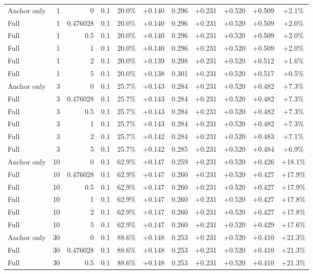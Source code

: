 \begin{table}[htbp]
\begin{tabular}{lrrrccccccc}
Anchor only & 1 & 0 & 0.1 & 20.0\% & +0.140 & 0.296 & +0.231 & +0.520 & +0.509 & +2.1\% \\
Full & 1 & 0.476028 & 0.1 & 20.0\% & +0.140 & 0.296 & +0.231 & +0.520 & +0.509 & +2.0\% \\
Full & 1 & 0.5 & 0.1 & 20.0\% & +0.140 & 0.296 & +0.231 & +0.520 & +0.509 & +2.0\% \\
Full & 1 & 1 & 0.1 & 20.0\% & +0.140 & 0.296 & +0.231 & +0.520 & +0.509 & +2.0\% \\
Full & 1 & 2 & 0.1 & 20.0\% & +0.139 & 0.298 & +0.231 & +0.520 & +0.512 & +1.6\% \\
Full & 1 & 5 & 0.1 & 20.0\% & +0.138 & 0.301 & +0.231 & +0.520 & +0.517 & +0.5\% \\
Anchor only & 3 & 0 & 0.1 & 25.7\% & +0.143 & 0.284 & +0.231 & +0.520 & +0.482 & +7.3\% \\
Full & 3 & 0.476028 & 0.1 & 25.7\% & +0.143 & 0.284 & +0.231 & +0.520 & +0.482 & +7.3\% \\
Full & 3 & 0.5 & 0.1 & 25.7\% & +0.143 & 0.284 & +0.231 & +0.520 & +0.482 & +7.3\% \\
Full & 3 & 1 & 0.1 & 25.7\% & +0.143 & 0.284 & +0.231 & +0.520 & +0.482 & +7.3\% \\
Full & 3 & 2 & 0.1 & 25.7\% & +0.142 & 0.284 & +0.231 & +0.520 & +0.483 & +7.1\% \\
Full & 3 & 5 & 0.1 & 25.7\% & +0.142 & 0.285 & +0.231 & +0.520 & +0.484 & +6.9\% \\
Anchor only & 10 & 0 & 0.1 & 62.9\% & +0.147 & 0.259 & +0.231 & +0.520 & +0.426 & +18.1\% \\
Full & 10 & 0.476028 & 0.1 & 62.9\% & +0.147 & 0.260 & +0.231 & +0.520 & +0.427 & +17.9\% \\
Full & 10 & 0.5 & 0.1 & 62.9\% & +0.147 & 0.260 & +0.231 & +0.520 & +0.427 & +17.9\% \\
Full & 10 & 1 & 0.1 & 62.9\% & +0.147 & 0.260 & +0.231 & +0.520 & +0.427 & +17.8\% \\
Full & 10 & 2 & 0.1 & 62.9\% & +0.147 & 0.260 & +0.231 & +0.520 & +0.427 & +17.8\% \\
Full & 10 & 5 & 0.1 & 62.9\% & +0.147 & 0.260 & +0.231 & +0.520 & +0.429 & +17.6\% \\
Anchor only & 30 & 0 & 0.1 & 88.6\% & +0.148 & 0.253 & +0.231 & +0.520 & +0.410 & +21.3\% \\
Full & 30 & 0.476028 & 0.1 & 88.6\% & +0.148 & 0.253 & +0.231 & +0.520 & +0.410 & +21.3\% \\
Full & 30 & 0.5 & 0.1 & 88.6\% & +0.148 & 0.253 & +0.231 & +0.520 & +0.410 & +21.3\% \\

\end{tabular}
\end{table}
